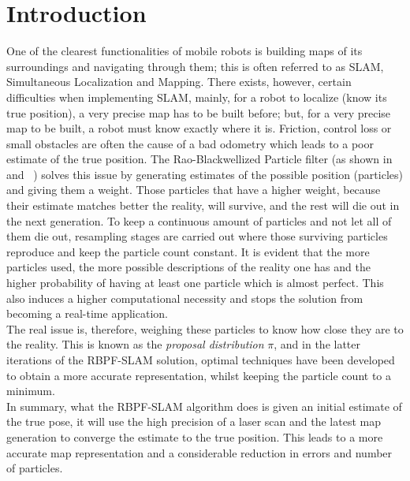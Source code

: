 \chapter{Introduction}
One of the clearest functionalities of mobile robots is building maps of its surroundings and navigating through them; this is often referred to as SLAM, Simultaneous Localization and Mapping. There exists, however, certain difficulties when implementing SLAM, mainly, for a robot to localize (know its true position), a very precise map has to be built before; but, for a very precise map to be built, a robot must know exactly where it is. Friction, control loss or small obstacles are often the cause of a bad odometry which leads to a poor estimate of the true position. The Rao-Blackwellized Particle filter (as shown in ~\cite{Doucet} and ~\cite{Murphy}) solves this issue by generating estimates of the possible position (particles) and giving them a weight. Those particles that have a higher weight, because their estimate matches better the reality, will survive, and the rest will die out in the next generation. To keep a continuous amount of particles and not let all of them die out, resampling stages are carried out where those surviving particles reproduce and keep the particle count constant. It is evident that the more particles used, the more possible descriptions of the reality one has and the higher probability of having at least one particle which is almost perfect. This also induces a higher computational necessity and stops the solution from becoming a real-time application.\\
The real issue is, therefore, weighing these particles to know how close they are to the reality. This is known as the \textit{proposal distribution} $\pi$, and in the latter iterations of the RBPF-SLAM solution, optimal techniques have been developed to obtain a more accurate representation, whilst keeping the particle count to a minimum.\\
In summary, what the RBPF-SLAM algorithm does is given an initial estimate of the true pose, it will use the high precision of a laser scan and the latest map generation to converge the estimate to the true position. This leads to a more accurate map representation and a considerable reduction in errors and number of particles.